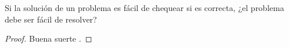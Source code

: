 \begin{statement}{2}
    Si la soluci\'on de un problema es f\'acil de chequear si es correcta, ¿el problema debe ser f\'acil de resolver?
\end{statement}

\begin{proof}
    Buena suerte \cite{Chen2024}.
\end{proof}